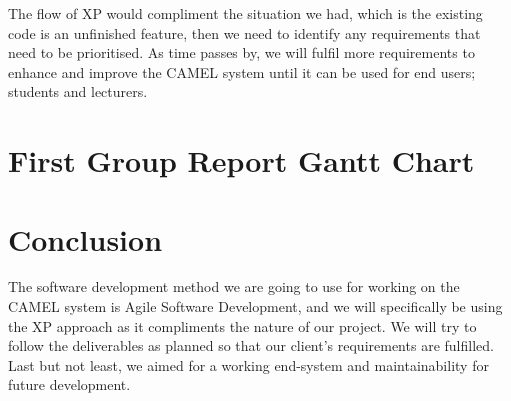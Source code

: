 \documentclass[12pt]{article}
\begin{document}
		The flow of XP would compliment the situation we had, which is the existing code is an unfinished feature, then we need to identify any requirements that need to be prioritised. As time passes by, we will fulfil more requirements to enhance and improve the CAMEL system until it can be used for end users; students and lecturers.
	
	\newpage
	
	\section{First Group Report Gantt Chart}
		
		
	\newpage
	
	\section{Conclusion}
		The software development method we are going to use for working on the CAMEL system is Agile Software Development, and we will specifically be using the XP approach as it compliments the nature of our project. We will try to follow the deliverables as planned so that our client’s requirements are fulfilled. Last but not least, we aimed for a working end-system and maintainability for future development.
		
	\newpage
	
	\printbibliography
	
\end{document}
